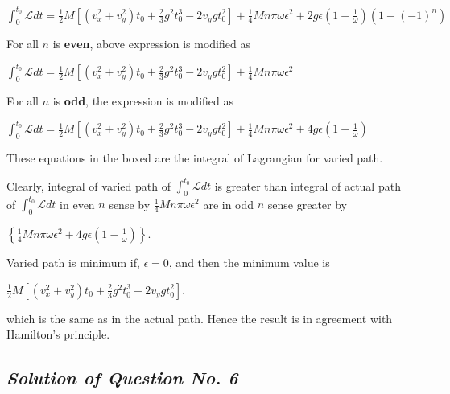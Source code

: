 \documentclass[12pt, a4paper]{article} %
\begin{document}
$\displaystyle \int_{0}^{t_0}\mathscr{L} dt  = \frac{1}{2}M\left[\left(v^2_x + v^2_y\right)t_0 + \frac{2}{3}g^2t^3_0 - 2v_y gt^2_0\right] + \frac{1}{4}M n\pi \omega \epsilon^2 + 2g\epsilon\left(1-\frac{1}{\omega}\right)\left(1-(-1)^n\right)$

\newpage

For all $n$ is {\bf even}, above expression is modified as


\begin{center}
    $\displaystyle \boxed{\int_{0}^{t_0}\mathscr{L} dt  = \frac{1}{2}M\left[\left(v^2_x + v^2_y\right)t_0 + \frac{2}{3}g^2t^3_0 - 2v_y gt^2_0\right] + \frac{1}{4}M n\pi \omega \epsilon^2}$
\end{center}

For all $n$ is {\bf odd}, the expression is modified as

\begin{center}
    $\displaystyle \boxed{\int_{0}^{t_0}\mathscr{L} dt  = \frac{1}{2}M\left[\left(v^2_x + v^2_y\right)t_0 + \frac{2}{3}g^2t^3_0 - 2v_y gt^2_0\right] + \frac{1}{4}M n\pi \omega \epsilon^2 + 4g\epsilon\left(1-\frac{1}{\omega}\right)}$
\end{center}

These equations in the boxed are the integral of Lagrangian for varied path.

\BgThispage

Clearly, integral of varied path of $\displaystyle \int_{0}^{t_0}\mathscr{L} dt$ is greater than integral of actual path of $\displaystyle \int_{0}^{t_0}\mathscr{L} dt$ in even $n$ sense by $\displaystyle\frac{1}{4}M n\pi \omega \epsilon^2$ are in odd $n$ sense greater by 
\begin{center}
    $\displaystyle \left\{\frac{1}{4}M n\pi \omega \epsilon^2 + 4g\epsilon\left(1-\frac{1}{\omega}\right)\right\}$.
\end{center}

Varied path is minimum if, $\epsilon = 0$, and then the minimum value is \begin{center}
    $\displaystyle \frac{1}{2}M\left[\left(v^2_x + v^2_y\right)t_0 + \frac{2}{3}g^2t^3_0 - 2v_y gt^2_0\right]$.
\end{center}

which is the same as in the actual path. Hence the result is in agreement with Hamilton's principle.

\newpage
\subsection{\slshape Solution of Question No. 6}
\end{document}
